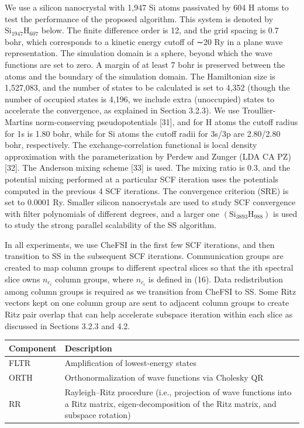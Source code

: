 \documentclass[
  10
]{article}
\newcounter{none} %
\begin{document}
We use a silicon nanocrystal with 1,947 Si atoms passivated by 604 H
atoms to test the performance of the proposed algorithm. This system is
denoted by \(\mathrm { S i _ { 1 9 4 7 } H _ { 6 0 7 } }\) below. The
finite difference order is 12, and the grid spacing is 0.7 bohr, which
corresponds to a kinetic energy cutoff of ∼20 Ry in a plane wave
representation. The simulation domain is a sphere, beyond which the wave
functions are set to zero. A margin of at least 7 bohr is preserved
between the atoms and the boundary of the simulation domain. The
Hamiltonian size is 1,527,083, and the number of states to be calculated
is set to 4,352 (though the number of occupied states is 4,196, we
include extra (unoccupied) states to accelerate the convergence, as
explained in Section 3.2.3). We use Troullier-Martins norm-conserving
pseudopotentials {[}31{]}, and for H atoms the cutoff radius for 1s is
1.80 bohr, while for Si atoms the cutoff radii for 3s/3p are 2.80/2.80
bohr, respectively. The exchange-correlation functional is local density
approximation with the parameterization by Perdew and Zunger (LDA CA PZ)
{[}32{]}. The Anderson mixing scheme {[}33{]} is used. The mixing ratio
is 0.3, and the potential mixing performed at a particular SCF iteration
uses the potentials computed in the previous 4 SCF iterations. The
convergence criterion (SRE) is set to 0.0001 Ry. Smaller silicon
nanocrystals are used to study SCF convergence with filter polynomials
of different degrees, and a larger one
\(\left( \mathrm { S i _ { 3 8 9 3 } H _ { 9 8 8 } } \right)\) is used
to study the strong parallel scalability of the SS algorithm.

In all experiments, we use CheFSI in the first few SCF iterations, and
then transition to SS in the subsequent SCF iterations. Communication
groups are created to map column groups to different spectral slices so
that the ith spectral slice owns \(n _ { c _ { i } }\) column groups,
where \(n _ { c _ { i } }\) is defined in (16). Data redistribution
among column groups is required as we transition from CheFSI to SS. Some
Ritz vectors kept on one column group are sent to adjacent column groups
to create Ritz pair overlap that can help accelerate subspace iteration
within each slice as discussed in Sections 3.2.3 and 4.2.

{\def\LTcaptype{none} %
\begin{longtable}[]{@{}|l|l|@{}}
\toprule\noalign{}
\endhead
\bottomrule\noalign{}
\endlastfoot
\hline
Component & Description \\
\hline
FLTR & Amplification of lowest-energy states \\
\hline
ORTH & Orthonormalization of wave functions via Cholesky QR \\
\hline
RR & Rayleigh--Ritz procedure (i.e., projection of wave functions into a
Ritz matrix, eigen-decomposition of the Ritz matrix, and subspace
rotation) \\
\hline
\end{longtable}
}
\end{document}
